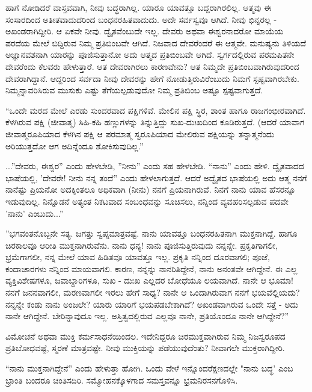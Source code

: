 ಹಾಗೆ ನೋಡಿದರೆ ವಾಸ್ತವವಾಗಿ, ನೀವು ಬದ್ಧರಾಗಿಲ್ಲ. ಯಾರೂ ಯಾವತ್ತೂ ಬದ್ದರಾಗಿರಲಿಲ್ಲ. ಆತ್ಮವು ಈ ಸಂಸಾರದಿಂದ ಅತೀತವಾದುದರಿಂದ ಬಂಧನರಹಿತವಾದುದು. ಅದೇ ಸರ್ವಸ್ವವೂ ಆಗಿದೆ. ನೀವು ಭಿನ್ನರಲ್ಲ - ಅಖಂಡರಾಗಿದ್ದೀರಿ. ಆ ಏಕವೇ ನೀವು. ದ್ವೈತವೆಂಬುದೇ ಇಲ್ಲ. ದೇವರು ಅಥವಾ ಈಶ್ವರನಾದರೋ ಮಾಯೆಯ ಪರದೆಯ ಮೇಲೆ ಬಿದ್ದಿರುವ ನಿಮ್ಮ ಪ್ರತಿಬಿಂಬವೇ ಆಗಿದೆ. ನಿಜವಾದ ದೇವರೆಂದರೆ ಈ ಆತ್ಮವೇ. ಮನುಷ್ಯನು ತಿಳಿಯದೆ ಅಜ್ಞಾನವಶನಾಗಿ ಯಾರನ್ನು ಪೂಜಿಸುತ್ತಾನೋ ಅದು ಆತ್ಮದ ಪ್ರತಿಬಿಂಬವೇ ಆಗಿದೆ. ಸ್ವರ್ಗದಲ್ಲಿರುವ ಪರಮಪಿತನೇ ದೇವರೆಂದು ಕೆಲವರು ಹೇಳುತ್ತಾರೆ. ಆತ ದೇವರಾಗಿರಲು ಕಾರಣವೇನು? ಆತ ನಿಮ್ಮದೇ ಪ್ರತಿಬಿಂಬವಾಗಿರುವುದರಿಂದ ದೇವರಾಗಿದ್ದಾನೆ. ಆದ್ದರಿಂದ ಸರ್ವದಾ ನೀವು ದೇವರನ್ನು ಹೇಗೆ ನೋಡುತ್ತಿರುವಿರೆಂಬುದು ನಿಮಗೆ ಸ್ಪಷ್ಟವಾಗಿರಬೇಕು. ನಿಮ್ಮನ್ನಾವರಿಸಿರುವ ಮುಸುಕು ಎಷ್ಟು ತೆಗೆಯಲ್ಪಡುವುದೋ ನಿಮ್ಮ ಪ್ರತಿಬಿಂಬ ಅಷ್ಟೂ ಸ್ಪಷ್ಟವಾಗುತ್ತದೆ.

“ಒಂದೇ ಮರದ ಮೇಲೆ ಎರಡು ಸುಂದರವಾದ ಪಕ್ಷಿಗಳಿವೆ. ಮೇಲಿನ ಪಕ್ಷಿ ಸ್ಥಿರ, ಶಾಂತ ಹಾಗೂ ರಾಜಗಂಭೀರವಾಗಿದೆ. ಕೆಳಗಿರುವ ಪಕ್ಷಿ (ಜೀವಾತ್ಮ) ಸಿಹಿ-ಕಹಿ ಹಣ್ಣುಗಳನ್ನು ತಿನ್ನುತ್ತಿದ್ದು ಸುಖ-ದುಃಖದಿಂದ ಕೂಡಿರುತ್ತದೆ. (ಆದರೆ ಯಾವಾಗ ಜೀವಾತ್ಮರೂಪಿಯಾದ ಕೆಳಗಿನ ಪಕ್ಷಿ ಆ ಪರಮಾತ್ಮ ಸ್ವರೂಪಿಯಾದ ಮೇಲಿರುವ ಪಕ್ಷಿಯನ್ನು ತನ್ನಾತ್ಮನೆಂದು ಅರಿಯುತ್ತದೋ ಆಗ ಅದಿನ್ನೆಂದೂ ಶೋಕಿಸುವುದಿಲ್ಲ.”

...''ದೇವರು, ಈಶ್ವರ” ಎಂದು ಹೇಳಬೇಡಿ, ''ನೀನು'' ಎಂದು ಸಹ ಹೇಳಬೇಡಿ. “ನಾನು” ಎಂದು ಹೇಳಿ. ದ್ವೈತವಾದದ ಭಾಷೆಯಲ್ಲಿ, 'ದೇವರೇ! ನೀನು ನನ್ನ ತಂದೆ” ಎಂದು ಹೇಳಲಾಗುತ್ತದೆ. ಆದರೆ ಅದ್ವೈತದ ಭಾಷೆಯಲ್ಲಿ ಅದು ಆತ್ಮ ನನಗೆ ನಾನೆಷ್ಟು ಪ್ರಿಯನೋ ಅದಕ್ಕಿಂತಲೂ ಅಧಿಕವಾಗಿ (ನೀನು) ನನಗೆ ಪ್ರಿಯನಾಗಿರುವೆ. ನಿನಗೆ ನಾನು ಯಾವ ಹೆಸರನ್ನೂ ಇಡುವುದಿಲ್ಲ. ನಿನ್ನೊಡನೆ ಅತ್ಯಂತ ನಿಕಟವಾದ ಸಂಬಂಧವನ್ನು ಸೂಚಿಸಲು, ನನ್ನಿಂದ ವ್ಯವಹರಿಸಲ್ಪಡುವ ಪದವೇ 'ನಾನು' ಎಂಬುದು...”

''ಭಗವಂತನೊಬ್ಬನೇ ಸತ್ಯ. ಜಗತ್ತು ಸ್ವಪ್ನಮಾತ್ರವಷ್ಟೆ. ನಾನು ಯಾವತ್ತೂ ಬಂಧನರಹಿತನಾಗಿ ಮುಕ್ತನಾಗಿದ್ದೆ. ಹಾಗೂ ಚಿರಕಾಲವೂ ಆರೀತಿ ಮುಕ್ತನಾಗಿರುವೆನು. ನಾನು ಧನ್ಯ! ನಾನು ಪೂಜಿಸುತ್ತಿರುವುದು ನನ್ನನ್ನೇ. ಪ್ರಕೃತಿಗಾಗಲೀ, ಭ್ರಮೆಗಾಗಲೀ, ನನ್ನ ಮೇಲೆ ಯಾವ ಹಿಡಿತವೂ ಯಾವತ್ತೂ ಇಲ್ಲ. ಪ್ರಕೃತಿ ನನ್ನಿಂದ ದೂರವಾಗಲಿ; ಪೂಜೆ, ಕಂದಾಚಾರಗಳು ನನ್ನಿಂದ ಮಾಯವಾಗಲಿ. ಕಾರಣ, ನನ್ನನ್ನು ನಾನರಿತಿದ್ದೇನೆ, ನಾನು ಅನಂತವೇ ಆಗಿದ್ದೇನೆ. ಈ ಎಲ್ಲ ವ್ಯಕ್ತಿವಿಶೇಷಗಳೂ, ಜವಾಬ್ದಾರಿಗಳೂ, ಸುಖ - ದುಃಖ ಎಲ್ಲದರ ಬೋಧೆಯೂ ಲಯವಾಗಿದೆ. ನಾನೇ ಆ ಭೂಮಾ! ನನಗೆ ಜನನವಾಗಲೀ, ಮರಣವಾಗಲೀ ಇರಲು ಹೇಗೆ ಸಾಧ್ಯ? ನಾನೇ ಆ ಒಂದಾಗಿರುವಾಗ ನನಗೆ ಭಯವೆಲ್ಲಿಯದು? ನನ್ನನ್ನೇ ಕಂಡು ನಾನು ಅಂಜಲೇ? ಯಾರು ಯಾರಿಗೆ ಭಯಪಡಬೇಕಾಗಿದೆ? ಅಖಂಡವಾಗಿರುವ ಒಂದೇ ಸತ್ತೆ - ಅದು ನಾನೇ ಆಗಿದ್ದೇನೆ. ಬೇರಿನ್ನಾವುದೂ ಇಲ್ಲ. ಅಸ್ತಿತ್ವದಲ್ಲಿರುವ ಎಲ್ಲವೂ ನಾನೇ, ಪ್ರತಿಯೊಂದೂ ನಾನೇ ಆಗಿದ್ದೇನೆ?”

ವಿಮೋಚನೆ ಅಥವಾ ಮುಕ್ತಿ ಕರ್ಮಸಾಧನೆಯಿಂದಲ. ಇದೇನಿದ್ದರೂ ಚಿರಮುಕ್ತವಾಗಿರುವ ನಿಮ್ಮ ನಿಜಸ್ವರೂಪದ ಪ್ರತಿಬೋಧವಷ್ಟೆ, ಸ್ಮರಣೆ ಮಾತ್ರವಷ್ಟೇ. ನೀವು ಮುಕ್ತಿಯನ್ನು ಪಡೆಯುವುದೆಂತು? ನೀವಾಗಲೇ ಮುಕ್ತರಾಗಿದ್ದೀರಿ.

“ನಾನು ಮುಕ್ತನಾಗಿದ್ದೇನೆ” ಎಂದು ಹೇಳುತ್ತಾ ಹೋಗಿ. ಒಂದು ವೇಳೆ ಇನ್ನೊಂದರೆಕ್ಷಣದಲ್ಲೇ "ನಾನು ಬದ್ಧ' ಎಂಬ ಭ್ರಾಂತಿ ಬಂದರೂ ಚಿಂತಿಸದಿರಿ. ಸಮ್ಮೋಹನಕ್ಕೊಳಗಾದ ಸಮಸ್ತವನ್ನೂ ಭ್ರಮನಿರಸನಗೊಳಿಸಿ.

